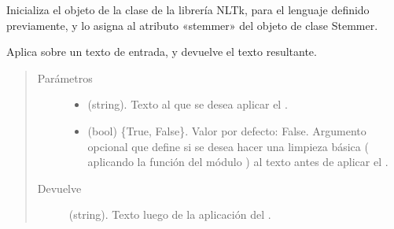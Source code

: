 \documentclass[letterpaper,10pt,openany,spanish]{sphinxmanual}
\begin{document}
\begin{fulllineitems}
\begin{fulllineitems}
\begin{quote}
\begin{description}
\end{description}\end{quote}

\end{fulllineitems}


\begin{fulllineitems}
\label{\detokenize{funciones/stemming:stemming.Stemmer.iniciar_stemmer}}
Inicializa el objeto de la clase  de la librería NLTk,         para el lenguaje definido previamente, y lo asigna al atributo «stemmer»         del objeto de clase Stemmer.

\end{fulllineitems}


\begin{fulllineitems}
\label{\detokenize{funciones/stemming:stemming.Stemmer.stemming}}
Aplica  sobre un texto de entrada, y devuelve el texto             resultante.
\begin{quote}\begin{description}
\item[{Parámetros}] \leavevmode\begin{itemize}
\item {} 
 \textendash{} (string). Texto al que se desea aplicar el .

\item {} 
 \textendash{} (bool) \{True, False\}. Valor por defecto: False. Argumento             opcional que define si se desea hacer una limpieza básica (            aplicando la función  del módulo ) al             texto antes de aplicar el .

\end{itemize}

\item[{Devuelve}] \leavevmode
(string). Texto luego de la aplicación del .

\end{description}\end{quote}

\end{fulllineitems}


\end{fulllineitems}
\end{document}

